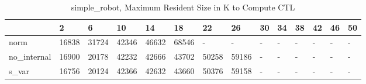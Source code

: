 \begin{table}
\caption{simple_robot, Maximum Resident Size in K to Compute CTL}
\label{simple_robot_CTL_size}
\begin{tabular}{llllllllllllll}
\toprule
 & 2 & 6 & 10 & 14 & 18 & 22 & 26 & 30 & 34 & 38 & 42 & 46 & 50 \\
\midrule
norm & 16838 & 31724 & 42346 & 46632 & 68546 & - & - & - & - & - & - & - & - \\
no_internal & 16900 & 20178 & 42232 & 42666 & 43702 & 50258 & 59186 & - & - & - & - & - & - \\
s_var & 16756 & 20124 & 42366 & 42632 & 43660 & 50376 & 59158 & - & - & - & - & - & - \\
\bottomrule
\end{tabular}
\end{table}
